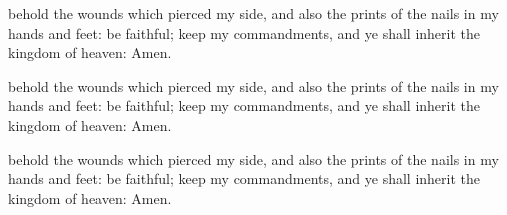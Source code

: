 		\begin{framed}
		\scriptsize
			\begin{compactdesc}
				\item[JSP] behold the wounds which pierced my side, and also the prints of the nails in my hands and feet: be faithful; keep my commandments, and ye shall inherit the kingdom of heaven: Amen.
				\item[DC 1835] behold the wounds which pierced my side, and also the prints of the nails in my hands and feet: be faithful; keep my commandments, and ye shall inherit the kingdom of heaven: Amen.
				\item[DC 1844] behold the wounds which pierced my side, and also the prints of the nails in my hands and feet: be faithful; keep my commandments, and ye shall inherit the kingdom of heaven: Amen.
			\end{compactdesc}
		\end{framed}